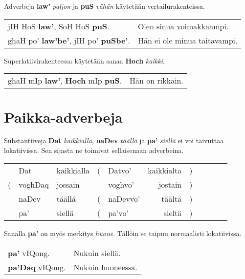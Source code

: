 \documentclass{book}
\begin{document}
Adverbeja \textbf{law'} \textit{paljon} ja \textbf{puS} \textit{vähän} käytetään vertailurakenteissa.

\begin{tabular}{l l}
    jIH HoS \textbf{law'}, SoH HoS \textbf{puS}. & Olen sinua voimakkaampi. \\
    ghaH po' \textbf{law'be'}, jIH po' \textbf{puSbe'}. & Hän ei ole minua taitavampi. \\
\end{tabular}

Superlatiivirakenteessa käytetään sanaa \textbf{Hoch} \textit{kaikki}.

\begin{tabular}{l l}
    ghaH mIp \textbf{law'}, \textbf{Hoch} mIp \textbf{puS}. & Hän on rikkain. \\
\end{tabular}

\section{Paikka-adverbeja}

Substantiiveja \textbf{Dat} \textit{kaikkialla}, \textbf{naDev} \textit{täällä} ja \textbf{pa'} \textit{siellä} ei voi taivuttaa lokatiivissa.
Sen sijasta ne toimivat sellaisenaan adverbeina.

\begin{tabular}{r Bl Il | r Bl Il l}
    & Dat & kaikkialla & ( & Datvo' & kaikkialta & ) \\
    ( & voghDaq & jossain & & voghvo' & jostain & ) \\
    & naDev & täällä & ( & naDevvo' & täältä & ) \\
    & pa' & siellä & ( & pa'vo' & sieltä & ) \\
\end{tabular}

Sanalla \textbf{pa'} on myös merkitys \textit{huone}.
Tällöin se taipuu normaalisti lokatiivissa.

\begin{tabular}{l l}
    \textbf{pa'} vIQong. & Nukuin siellä. \\
    \textbf{pa'Daq} vIQong. & Nukuin huoneessa. \\
\end{tabular}
\end{document}
